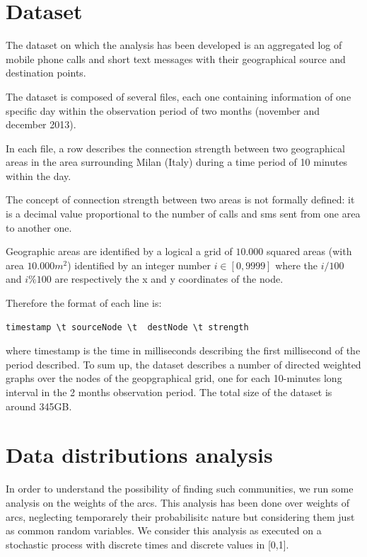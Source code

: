 \section{Dataset}
\label{thedataset}

The dataset on which the analysis has been developed is an aggregated log of mobile phone
calls and short text messages with their geographical source and destination points.

The dataset is composed of several files, each one containing information of one specific day
within the observation period of two months (november and december 2013).


In each file, a row describes the connection strength between two geographical areas in the area surrounding Milan (Italy) during a time period of 10 minutes within the day.

The concept of connection strength between two areas is not formally defined: it is a decimal value proportional to the number of calls and sms sent from one area to another one.

Geographic areas are identified by a logical a grid of $10.000$ squared areas 
(with area $10.000m^2$) 
identified by an integer number $i \in [0, 9999]$ where the
$ i / 100 $ and $ i \% 100 $ are respectively the  
x and y coordinates of the node.

Therefore the format of each line is:

\begin{verbatim}
timestamp \t sourceNode	\t 	destNode \t strength
\end{verbatim}

where timestamp is the time in milliseconds describing the first millisecond of the period described.
To sum up, the dataset describes a number of directed weighted graphs over
the nodes of the geopgraphical grid, one for each 10-minutes long interval
in the 2 months observation period. The total size of the dataset is around 345GB.

\section{Data distributions analysis}
\label{ds_analysis}

In order to understand the possibility of finding such communities, we run some analysis on the weights of the arcs.
This analysis has been done over weights of arcs, neglecting temporarely their probabilisitc nature but considering
them just as common random variables.
We consider this analysis as executed on a stochastic process with discrete times and discrete values in [0,1].


